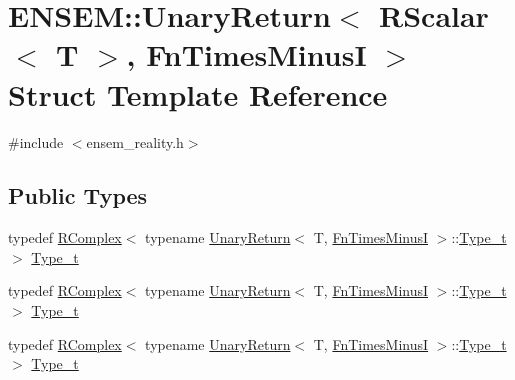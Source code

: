 \hypertarget{structENSEM_1_1UnaryReturn_3_01RScalar_3_01T_01_4_00_01FnTimesMinusI_01_4}{}\section{E\+N\+S\+EM\+:\+:Unary\+Return$<$ R\+Scalar$<$ T $>$, Fn\+Times\+MinusI $>$ Struct Template Reference}
\label{structENSEM_1_1UnaryReturn_3_01RScalar_3_01T_01_4_00_01FnTimesMinusI_01_4}


{\ttfamily \#include $<$ensem\+\_\+reality.\+h$>$}

\subsection*{Public Types}
\begin{DoxyCompactItemize}
\item 
typedef \mbox{\hyperlink{classENSEM_1_1RComplex}{R\+Complex}}$<$ typename \mbox{\hyperlink{structENSEM_1_1UnaryReturn}{Unary\+Return}}$<$ T, \mbox{\hyperlink{structENSEM_1_1FnTimesMinusI}{Fn\+Times\+MinusI}} $>$\+::\mbox{\hyperlink{structENSEM_1_1UnaryReturn_3_01RScalar_3_01T_01_4_00_01FnTimesMinusI_01_4_a89dcc5ccc293077b2cb0c8328b6c883a}{Type\+\_\+t}} $>$ \mbox{\hyperlink{structENSEM_1_1UnaryReturn_3_01RScalar_3_01T_01_4_00_01FnTimesMinusI_01_4_a89dcc5ccc293077b2cb0c8328b6c883a}{Type\+\_\+t}}
\item 
typedef \mbox{\hyperlink{classENSEM_1_1RComplex}{R\+Complex}}$<$ typename \mbox{\hyperlink{structENSEM_1_1UnaryReturn}{Unary\+Return}}$<$ T, \mbox{\hyperlink{structENSEM_1_1FnTimesMinusI}{Fn\+Times\+MinusI}} $>$\+::\mbox{\hyperlink{structENSEM_1_1UnaryReturn_3_01RScalar_3_01T_01_4_00_01FnTimesMinusI_01_4_a89dcc5ccc293077b2cb0c8328b6c883a}{Type\+\_\+t}} $>$ \mbox{\hyperlink{structENSEM_1_1UnaryReturn_3_01RScalar_3_01T_01_4_00_01FnTimesMinusI_01_4_a89dcc5ccc293077b2cb0c8328b6c883a}{Type\+\_\+t}}
\item 
typedef \mbox{\hyperlink{classENSEM_1_1RComplex}{R\+Complex}}$<$ typename \mbox{\hyperlink{structENSEM_1_1UnaryReturn}{Unary\+Return}}$<$ T, \mbox{\hyperlink{structENSEM_1_1FnTimesMinusI}{Fn\+Times\+MinusI}} $>$\+::\mbox{\hyperlink{structENSEM_1_1UnaryReturn_3_01RScalar_3_01T_01_4_00_01FnTimesMinusI_01_4_a89dcc5ccc293077b2cb0c8328b6c883a}{Type\+\_\+t}} $>$ \mbox{\hyperlink{structENSEM_1_1UnaryReturn_3_01RScalar_3_01T_01_4_00_01FnTimesMinusI_01_4_a89dcc5ccc293077b2cb0c8328b6c883a}{Type\+\_\+t}}
\end{DoxyCompactItemize}


